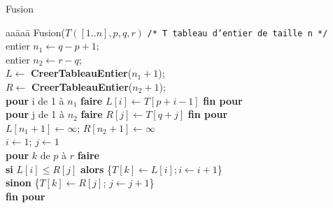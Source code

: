\begin{frame}{Fusion \\}
  \begin{tabbing}
    aa\=aaa\=\kill
    Fusion($T([1..n],p,q,r)$ \hfill \texttt{/* T tableau d'entier de taille n */} \\
    \> entier $n_1\leftarrow q-p+1$; \\
    \> entier $n_2\leftarrow r-q$; \\
   \>  $L \leftarrow$ \textbf{CreerTableauEntier}($n_1+1$); \\
    \>  $R \leftarrow$ \textbf{CreerTableauEntier}($n_2+1$); \\  
 \> \textbf{pour} i de 1 à $n_1$ \textbf{faire}
  $L[i]\leftarrow T[p+i-1]$ \textbf{fin pour} \\
 \> \textbf{pour} j de 1 à $n_2$ \textbf{faire}
  $R[j]\leftarrow T[q+j]$ \textbf{fin pour} \\
\> $L[n_1+1]\leftarrow \infty$; $R[n_2+1]\leftarrow \infty$\\
\> $i \leftarrow 1$; $j \leftarrow 1$\\
\> \textbf{pour} $k$ de $p$ à $r$ \textbf{faire} \\
\> \textbf{si} $L[i]\leq R[j]$ \textbf{alors}  \{$T[k]\leftarrow L[i]; i \leftarrow i+1$\}\\
 \> \textbf{sinon}  \{$T[k]\leftarrow R[j]$; $j \leftarrow j+1$\}\\
\> \textbf{fin pour} 
\end{tabbing}
 \end{frame}


